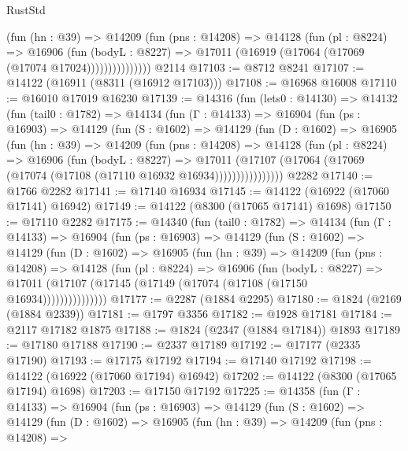 \begin{lexlean}{RustStd}
\begin{coremodule}
                  (fun (hn : @39) =>
                  @14209
                    (fun (pns : @14208) =>
                    @14128
                      (fun (pl : @8224) =>
                      @16906
                        (fun (bodyL : @8227) =>
                        @17011 (@16919 (@17064 (@17069 (@17074 @17024)))))))))))))))
    @2114
@17103 := @8712 @8241
@17107 := @14122 (@16911 (@8311 (@16912 @17103)))
@17108 := @16968 @16008
@17110 := @16010 @17019 @16230
@17139 := @14316
    (fun (lets0 : @14130) =>
    @14132
      (fun (tail0 : @1782) =>
      @14134
        (fun (Γ : @14133) =>
        @16904
          (fun (ps : @16903) =>
          @14129
            (fun (S : @1602) =>
            @14129
              (fun (D : @1602) =>
              @16905
                (fun (hn : @39) =>
                @14209
                  (fun (pns : @14208) =>
                  @14128
                    (fun (pl : @8224) =>
                    @16906
                      (fun (bodyL : @8227) =>
                      @17011
                        (@17107
                          (@17064 (@17069 (@17074 (@17108 (@17110 @16932 @16934))))))))))))))))
    @2282
@17140 := @1766 @2282
@17141 := @17140 @16934
@17145 := @14122 (@16922 (@17060 @17141) @16942)
@17149 := @14122 (@8300 (@17065 @17141) @1698)
@17150 := @17110 @2282
@17175 := @14340
    (fun (tail0 : @1782) =>
    @14134
      (fun (Γ : @14133) =>
      @16904
        (fun (ps : @16903) =>
        @14129
          (fun (S : @1602) =>
          @14129
            (fun (D : @1602) =>
            @16905
              (fun (hn : @39) =>
              @14209
                (fun (pns : @14208) =>
                @14128
                  (fun (pl : @8224) =>
                  @16906
                    (fun (bodyL : @8227) =>
                    @17011 (@17107 (@17145 (@17149 (@17074 (@17108 (@17150 @16934)))))))))))))))
@17177 := @2287 (@1884 @2295)
@17180 := @1824 (@2169 (@1884 @2339))
@17181 := @1797 @3356
@17182 := @1928 @17181
@17184 := @2117 @17182 @1875
@17188 := @1824 (@2347 (@1884 @17184)) @1893
@17189 := @17180 @17188
@17190 := @2337 @17189
@17192 := @17177 (@2335 @17190)
@17193 := @17175 @17192
@17194 := @17140 @17192
@17198 := @14122 (@16922 (@17060 @17194) @16942)
@17202 := @14122 (@8300 (@17065 @17194) @1698)
@17203 := @17150 @17192
@17225 := @14358
    (fun (Γ : @14133) =>
    @16904
      (fun (ps : @16903) =>
      @14129
        (fun (S : @1602) =>
        @14129
          (fun (D : @1602) =>
          @16905
            (fun (hn : @39) =>
            @14209
              (fun (pns : @14208) =>

\end{coremodule}
\end{lexlean}
